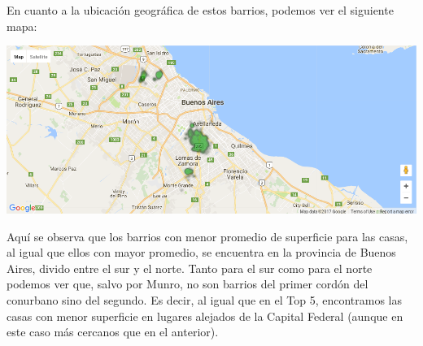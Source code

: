 \documentclass[a4paper, 10pt]{article}
\newcommand\tab[1][0.5cm]{\hspace*{#1}}
\begin{document}
				  	\tab En cuanto a la ubicación geográfica de estos barrios, podemos ver el siguiente mapa:
				  	\begin{center}
   		    				\includegraphics[width=\textwidth]{../images/houseSurfaceBottomMap}
				  	\end{center}
				  	\tab Aquí se observa que los barrios con menor promedio de superficie para las casas, al igual que ellos con
				  	mayor promedio, se encuentra en la provincia de Buenos Aires, divido entre el sur y el norte. Tanto para el
				  	sur como para el norte podemos ver que, salvo por Munro, no son barrios del primer cordón del conurbano sino
				  	del segundo. Es decir, al igual que en el Top 5, encontramos las casas con menor superficie en lugares alejados
				  	de la Capital Federal (aunque en este caso más cercanos que en el anterior).
\end{document}

